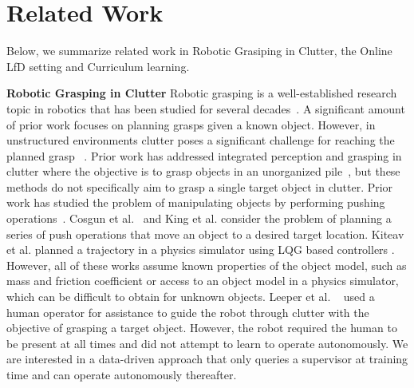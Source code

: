 \documentclass[10pt, conference]{ieeeconf}      %
\newcommand{\mlnote}[1]{\ifthenelse{ \boolean{include-notes}}%
 {\textcolor{purple}{\textbf{ML: #1}}}{}}
\begin{document}


\section{Related Work}
Below, we summarize related work in Robotic Grasiping in Clutter, the Online LfD setting and Curriculum learning.

\noindent \textbf{Robotic Grasping in Clutter}
Robotic grasping is a well-established research topic in robotics that has been studied for several
decades~\cite{bicchi2000robotic}. A significant amount of prior work focuses on planning grasps given a known object.
However, in unstructured environments clutter poses a significant challenge for reaching the planned grasp
~\cite{katz2008can}. Prior work has addressed integrated perception and grasping in clutter where the objective is to
grasp objects in an unorganized pile~\cite{pinto2015supersizing,nieuwenhuisen2013mobile}, but these methods do not
specifically aim to grasp a single target object in clutter. 
Prior work has studied the problem of manipulating objects
by performing pushing operations~\cite{mason1986mechanics}.  Cosgun et al.~\cite{cosgun2011push} and King et al. \cite{kingnonprehensile} consider the problem of planning a series of push operations that move an object to a
desired target location. Kiteav et al. planned a trajectory in a physics simulator using LQG based controllers
\cite{kitaevphysics}. However, all of these works assume known properties of the object model, such as mass and friction
coefficient  or access to an object model in a physics simulator, which can be difficult to obtain for unknown objects. 
Leeper et al. ~\cite{leeper2012strategies} used a human operator for assistance
to guide the robot through clutter with the objective of grasping a target object. However, the robot required the human
to be present at all times and did not attempt to learn to operate autonomously. We are interested in a data-driven
approach that only queries a supervisor at training time and  can operate autonomously thereafter.
\end{document}
